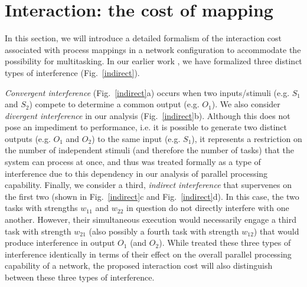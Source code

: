 \documentclass[10pt,letterpaper]{article}
\begin{document}
%
%
\section{Interaction: the cost of mapping}
%
In this section, we will introduce a detailed formalism of the interaction cost associated with process mappings in a network configuration to accommodate the possibility for multitasking. In our earlier work \cite{CogSci_2016}, we have formalized three distinct types of interference (Fig.~\ref{indirect}).

\emph{Convergent interference} (Fig.~\ref{indirect}a) occurs when two inputs/stimuli (e.g. $S_1$ and $S_2$) compete to determine a common output (e.g. $O_1$). We also consider \emph{divergent interference} in our analysis (Fig.~\ref{indirect}b). Although this does not pose an impediment to performance, i.e. it is possible to generate two distinct outputs (e.g. $O_1$ and $O_2$) to the same input (e.g. $S_1$), it represents a restriction on the number of independent stimuli (and therefore the number of tasks) that the system can process at once, and thus was treated formally as a type of interference due to this dependency in our analysis of parallel processing capability. Finally, we consider a third, \emph{indirect interference} that supervenes on the first two (shown in Fig.~\ref{indirect}c and Fig.~\ref{indirect}d). In this case, the two tasks with strengths $w_{11}$ and $w_{22}$ in question do not directly interfere with one another. However, their simultaneous execution would necessarily engage a third task with strength $w_{21}$ (also possibly a fourth task with strength $w_{12}$) that would produce interference in output $O_1$ (and $O_2$). While  treated these three types of interference identically in terms of their effect on the overall parallel processing capability of a network, the proposed interaction cost will also distinguish between these three types of interference.
\end{document}

